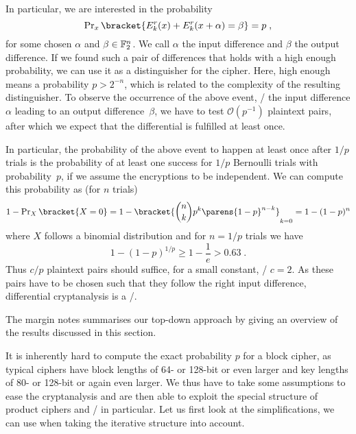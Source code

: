 In particular, we are interested in the probability
\begin{equation*}
    \Prob_x\bracket{E_k^r(x) + E_k^r(x + \alpha) = \beta} = p\;,
\end{equation*}
for some chosen $\alpha$ and $\beta \in \mathbb{F}_2^n$.
We call $\alpha$ the input difference and $\beta$ the output difference.
If we found such a pair of differences that holds with a high enough probability, we can use it as a distinguisher for the cipher.
Here, high enough means a probability $p > 2^{-n}$, which is related to the complexity of the resulting distinguisher.
To observe the occurrence of the above event, \ie/ the input difference $\alpha$ leading to an output difference~$\beta$, we have to test $\mathcal{O}(p^{-1})$ plaintext pairs, after which we expect that the differential is fulfilled at least once.

In particular, the probability of the above event to happen at least once after $1/p$ trials is the probability of at least one success for $1/p$ Bernoulli trials with probability~$p$, if we assume the encryptions to be independent.
We can compute this probability as (for $n$ trials)
\begin{equation*}
    1 - \Prob_X\bracket{X = 0} = 1 - \bracket{\binom{n}{k} p^k \parens{1-p}^{n-k}}_{k=0} = 1 - (1 - p)^n
\end{equation*}
where $X$ follows a binomial distribution and for $n = 1/p$ trials we have
\begin{equation*}
    1 - (1 - p)^{1/p} \geqslant 1 - \frac{1}{e} > 0.63\;.
\end{equation*}
Thus $c/p$ plaintext pairs should suffice, for a small constant, \eg/ $c = 2$.
As these pairs have to be chosen such that they follow the right input difference, differential cryptanalysis is a \CPAl/.

The margin notes summarises our top-down approach by giving an overview of the results discussed in this section.

It is inherently hard to compute the exact probability $p$ for a block cipher, as typical ciphers have block lengths of 64- or 128-bit or even larger and key lengths of 80- or 128-bit or again even larger.
We thus have to take some assumptions to ease the cryptanalysis and are then able to exploit the special structure of product ciphers and \SPNp/ in particular.
Let us first look at the simplifications, we can use when taking the iterative structure into account.

